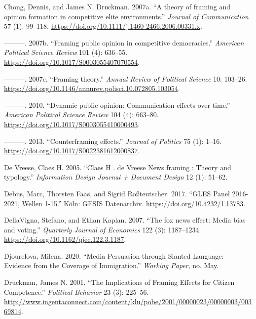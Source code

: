 \documentclass[
  12pt,
]{article}
\newlength{\cslhangindent}
\newlength{\cslentryspacingunit} %
\newenvironment{CSLReferences}[2] %
 {%
  \setlength{\parindent}{0pt}
  \ifodd #1
  \let\oldpar\par
  \def\par{\hangindent=\cslhangindent\oldpar}
  \fi
  \setlength{\parskip}{#2\cslentryspacingunit}
 }%
 {}
\begin{document}
\begin{CSLReferences}{1}{0}
\leavevmode{}%
Chong, Dennis, and James N. Druckman. 2007a. {``{A theory of framing and opinion formation in competitive elite environments}.''} \emph{Journal of Communication} 57 (1): 99--118. \url{https://doi.org/10.1111/j.1460-2466.2006.00331.x}.

\leavevmode{}%
---------. 2007b. {``{Framing public opinion in competitive democracies}.''} \emph{American Political Science Review} 101 (4): 636--55. \url{https://doi.org/10.1017/S0003055407070554}.

\leavevmode{}%
---------. 2007c. {``{Framing theory}.''} \emph{Annual Review of Political Science} 10: 103--26. \url{https://doi.org/10.1146/annurev.polisci.10.072805.103054}.

\leavevmode{}%
---------. 2010. {``{Dynamic public opinion: Communication effects over time}.''} \emph{American Political Science Review} 104 (4): 663--80. \url{https://doi.org/10.1017/S0003055410000493}.

\leavevmode{}%
---------. 2013. {``{Counterframing effects}.''} \emph{Journal of Politics} 75 (1): 1--16. \url{https://doi.org/10.1017/S0022381612000837}.

\leavevmode{}%
De Vreese, Claes H. 2005. {``{Claes H . de Vreese News framing : Theory and typology}.''} \emph{Information Design Journal + Document Design} 12 (1): 51--62.

\leavevmode{}%
Debus, Marc, Thorsten Faas, and Sigrid Roßteutscher. 2017. {``{GLES Panel 2016-2021, Wellen 1-15}.''} K{ö}ln: GESIS Datenarchiv. \url{https://doi.org/10.4232/1.13783}.

\leavevmode{}%
DellaVigna, Stefano, and Ethan Kaplan. 2007. {``{The fox news effect: Media bias and voting}.''} \emph{Quarterly Journal of Economics} 122 (3): 1187--1234. \url{https://doi.org/10.1162/qjec.122.3.1187}.

\leavevmode{}%
Djourelova, Milena. 2020. {``{Media Persuasion through Slanted Language: Evidence from the Coverage of Immigration}.''} \emph{Working Paper}, no. May.

\leavevmode{}%
Druckman, James N. 2001. {``{The Implications of Framing Effects for Citizen Competence}.''} \emph{Political Behavior} 23 (3): 225--56. \url{http://www.ingentaconnect.com/content/klu/pobe/2001/00000023/00000003/00369814}.


\end{CSLReferences}
\end{document}
